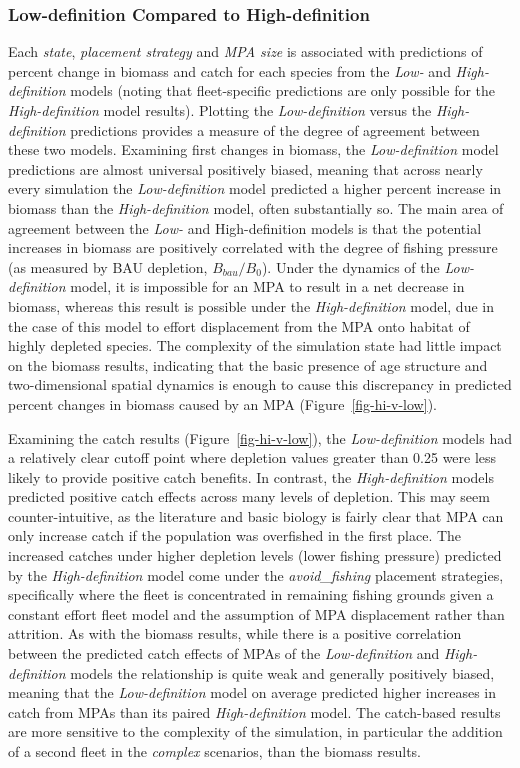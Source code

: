 \documentclass[
  default,
  lineno,
  referee]{sn-jnl}
\begin{document}
\subsubsection{Low-definition Compared to
High-definition}\label{sec-compare}

Each \emph{state}, \emph{placement strategy} and \emph{MPA size} is
associated with predictions of percent change in biomass and catch for
each species from the \emph{Low-} and \emph{High-definition} models
(noting that fleet-specific predictions are only possible for the
\emph{High-definition} model results). Plotting the
\emph{Low-definition} versus the \emph{High-definition} predictions
provides a measure of the degree of agreement between these two models.
Examining first changes in biomass, the \emph{Low-definition} model
predictions are almost universal positively biased, meaning that across
nearly every simulation the \emph{Low-definition} model predicted a
higher percent increase in biomass than the \emph{High-definition}
model, often substantially so. The main area of agreement between the
\emph{Low-} and High-definition models is that the potential increases
in biomass are positively correlated with the degree of fishing pressure
(as measured by BAU depletion, \(B_{bau}/B_0\)). Under the dynamics of
the \emph{Low-definition} model, it is impossible for an MPA to result
in a net decrease in biomass, whereas this result is possible under the
\emph{High-definition} model, due in the case of this model to effort
displacement from the MPA onto habitat of highly depleted species. The
complexity of the simulation state had little impact on the biomass
results, indicating that the basic presence of age structure and
two-dimensional spatial dynamics is enough to cause this discrepancy in
predicted percent changes in biomass caused by an MPA
(Figure~\ref{fig-hi-v-low}).

Examining the catch results (Figure~\ref{fig-hi-v-low}), the
\emph{Low-definition} models had a relatively clear cutoff point where
depletion values greater than 0.25 were less likely to provide positive
catch benefits. In contrast, the \emph{High-definition} models predicted
positive catch effects across many levels of depletion. This may seem
counter-intuitive, as the literature and basic biology is fairly clear
that MPA can only increase catch if the population was overfished in the
first place. The increased catches under higher depletion levels (lower
fishing pressure) predicted by the \emph{High-definition} model come
under the \emph{avoid\_fishing} placement strategies, specifically where
the fleet is concentrated in remaining fishing grounds given a constant
effort fleet model and the assumption of MPA displacement rather than
attrition. As with the biomass results, while there is a positive
correlation between the predicted catch effects of MPAs of the
\emph{Low-definition} and \emph{High-definition} models the relationship
is quite weak and generally positively biased, meaning that the
\emph{Low-definition} model on average predicted higher increases in
catch from MPAs than its paired \emph{High-definition} model. The
catch-based results are more sensitive to the complexity of the
simulation, in particular the addition of a second fleet in the
\emph{complex} scenarios, than the biomass results.
\end{document}
